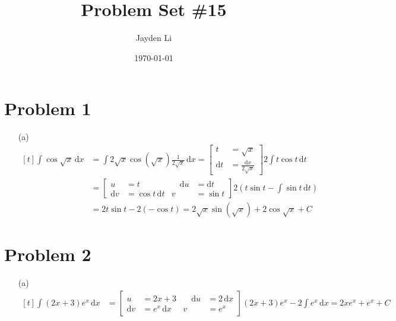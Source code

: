 \documentclass[preview, margin=0.6in]{standalone}
\title{\vspace*{-30pt}Problem Set \#15}
\author{Jayden Li}
\date{\today}
\newcommand*{\problem}[1]{\section*{Problem #1}}
\begin{document}
\fontsize{12pt}{12pt}\selectfont
\setlength{\abovedisplayskip}{0pt}
\maketitle
\problem{1}
\begin{itemize}
	\item[(a)]
		$\begin{aligned}[t]
		    \int \cos \sqrt{x}\,\mathrm{d}x
			&=\int 2\sqrt{x}\cos\left(\sqrt{x}\right)\frac{1}{2 \sqrt{x}}\,\mathrm{d}x
			=\left[\begin{aligned}
			    t&=\sqrt{x} \\
				\mathrm{d}t&=\frac{\mathrm{d}x}{2 \sqrt{x}}
			\end{aligned}\right]
			2 \int t\cos t\,\mathrm{d}t \\
			&=\left[\begin{alignedat}{2}
					u&=t &\quad \mathrm{d}u&=\mathrm{d}t \\
					\mathrm{d}v&=\cos t \,\mathrm{d}t & v&=\sin t
			\end{alignedat}\right]
			2\left(t\sin t-\int \sin t\,\mathrm{d}t\right) \\
			&=2t\sin t-2(-\cos t)
			=\boxed{2\sqrt{x}\sin\left(\sqrt{x}\right)+2\cos \sqrt{x}+C}
		\end{aligned}$
\end{itemize}

\problem{2}
\begin{itemize}
	\item[(a)]
		$\begin{aligned}[t]
		    \int (2x+3)e^x\,\mathrm{d}x
			&=\left[\begin{alignedat}{2}
					u&=2x+3 &\quad \mathrm{d}u&=2 \,\mathrm{d}x \\
					\mathrm{d}v&=e^x \,\mathrm{d}x & v&=e^x
			\end{alignedat}\right]
			(2x+3)e^x-2 \int e^x\,\mathrm{d}x
			=\boxed{2xe^x+e^x+C}
		\end{aligned}$
\end{itemize}
\end{document}
